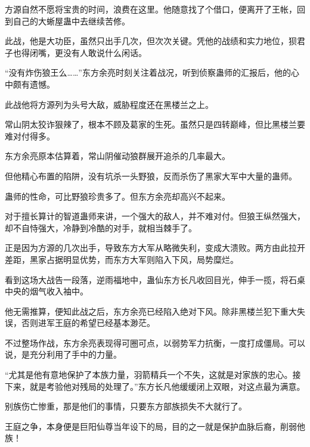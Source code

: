 \begin{this_body}
方源自然不愿将宝贵的时间，浪费在这里。他随意找了个借口，便离开了王帐，回到自己的大蜥屋蛊中去继续苦修。

此战，他是大功臣，虽然只出手几次，但次次关键。凭他的战绩和实力地位，狈君子也得闭嘴，更没有人敢说什么闲话。

“没有炸伤狼王么……”东方余亮时刻关注着战况，听到侦察蛊师的汇报后，他的心中颇有遗憾。

此战他将方源列为头号大敌，威胁程度还在黑楼兰之上。

常山阴太狡诈狠辣了，根本不顾及葛家的生死。虽然只是四转巅峰，但比黑楼兰要难对付得多。

东方余亮原本估算着，常山阴催动狼群展开追杀的几率最大。

但他精心布置的陷阱，没有坑杀一头野狼，反而杀伤了黑家大军中大量的蛊师。

蛊师的性命，可比野狼珍贵多了。但东方余亮却高兴不起来。

对于擅长算计的智道蛊师来讲，一个强大的敌人，并不难对付。但狼王纵然强大，却不自恃强大，冷静到冷酷的对手，就相当棘手了。

正是因为方源的几次出手，导致东方大军从略微失利，变成大溃败。两方由此拉开差距，黑家占据明显优势，而东方大军则陷入下风，局势糜烂。

看到这场大战告一段落，逆雨福地中，蛊仙东方长凡收回目光，伸手一揽，将石桌中央的烟气收入袖中。

他无需推算，便知此战之后，东方余亮已经陷入绝对下风。除非黑楼兰犯下重大失误，否则进军王庭的希望已经基本渺茫。

不过整场作战，东方余亮表现得可圈可点，以弱势军力抗衡，一度打成僵局。可以说，是充分利用了手中的力量。

“尤其是他有意地保护了本族力量，羽箭精兵一个不失，这就是对家族的忠心。接下来，就是考验他对残局的处理了。”东方长凡他缓缓闭上双眼，对这点最为满意。

别族伤亡惨重，那是他们的事情，只要东方部族损失不大就行了。

王庭之争，本身便是巨阳仙尊当年设下的局，目的之一就是保护血脉后裔，削弱他族！

\end{this_body}

